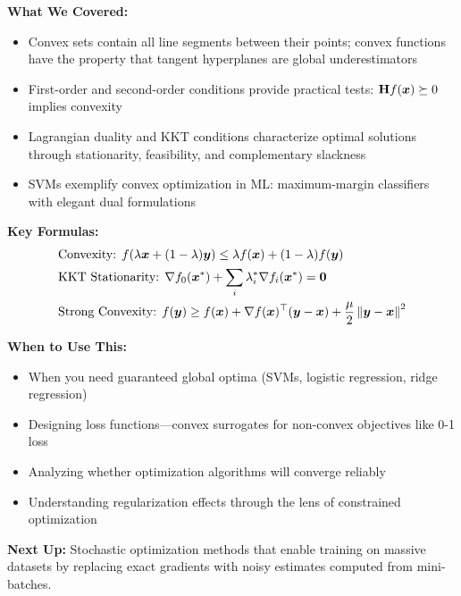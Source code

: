 \documentclass[../../main.tex]{subfiles}
\begin{document}
\begin{chaptersummary}
\textbf{What We Covered:}
\begin{itemize}
    \item Convex sets contain all line segments between their points; convex functions have the property that tangent hyperplanes are global underestimators
    \item First-order and second-order conditions provide practical tests: $\mathbf{H} f(\boldsymbol{x}) \succeq 0$ implies convexity
    \item Lagrangian duality and KKT conditions characterize optimal solutions through stationarity, feasibility, and complementary slackness
    \item SVMs exemplify convex optimization in ML: maximum-margin classifiers with elegant dual formulations
\end{itemize}

\textbf{Key Formulas:}
\begin{align*}
    &\text{Convexity: } f(\lambda \boldsymbol{x} + (1-\lambda)\boldsymbol{y}) \leq \lambda f(\boldsymbol{x}) + (1-\lambda)f(\boldsymbol{y}) \\
    &\text{KKT Stationarity: } \nabla f_0(\boldsymbol{x}^*) + \sum_i \lambda_i^* \nabla f_i(\boldsymbol{x}^*) = \boldsymbol{0} \\
    &\text{Strong Convexity: } f(\boldsymbol{y}) \geq f(\boldsymbol{x}) + \nabla f(\boldsymbol{x})^\top (\boldsymbol{y} - \boldsymbol{x}) + \frac{\mu}{2}\left\lVert \boldsymbol{y} - \boldsymbol{x} \right\rVert^2
\end{align*}

\textbf{When to Use This:}
\begin{itemize}
    \item When you need guaranteed global optima (SVMs, logistic regression, ridge regression)
    \item Designing loss functions---convex surrogates for non-convex objectives like 0-1 loss
    \item Analyzing whether optimization algorithms will converge reliably
    \item Understanding regularization effects through the lens of constrained optimization
\end{itemize}

\textbf{Next Up:} Stochastic optimization methods that enable training on massive datasets by replacing exact gradients with noisy estimates computed from mini-batches.
\end{chaptersummary}
\end{document}
